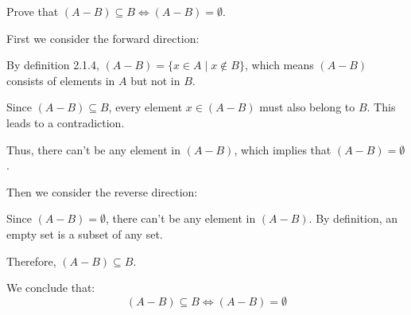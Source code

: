 \documentclass{article}
\begin{document}
Prove that $(A - B) \subseteq B \iff (A - B) = \emptyset$.

First we consider the forward direction:

By definition 2.1.4, $(A-B)=\{x\in A \mid x\not\in B\}$, which means $(A-B)$ consists of elements in $A$ but not in $B$.

Since $(A-B) \subseteq B$, every element $x \in (A-B)$ must also belong to $B$. 
This leads to a contradiction.

Thus, there can't be any element in $(A-B)$, which implies that $(A-B) = \emptyset$.

Then we consider the reverse direction:

Since $(A-B) = \emptyset$, there can't be any element in $(A-B)$. 
By definition, an empty set is a subset of any set.

Therefore, $(A-B) \subseteq B$.

We conclude that: \[(A - B) \subseteq B \iff (A - B) = \emptyset\]
\end{document}
